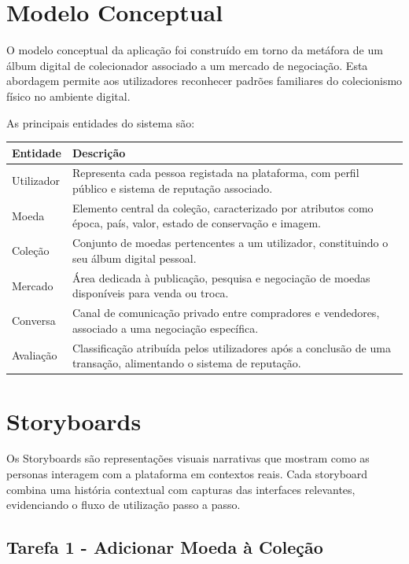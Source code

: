 \documentclass[12pt,a4paper]{article}
\begin{document}
\section{Modelo Conceptual}

O modelo conceptual da aplicação foi construído em torno da metáfora de um álbum digital de colecionador associado a um mercado de negociação. Esta abordagem permite aos utilizadores reconhecer padrões familiares do colecionismo físico no ambiente digital.

As principais entidades do sistema são:

\begin{longtable}{>{\raggedright\arraybackslash}p{} >{\raggedright\arraybackslash}p{}}
\toprule
\textbf{Entidade} & \textbf{Descrição} \\
\midrule
Utilizador & Representa cada pessoa registada na plataforma, com perfil público e sistema de reputação associado. \\
Moeda & Elemento central da coleção, caracterizado por atributos como época, país, valor, estado de conservação e imagem. \\
Coleção & Conjunto de moedas pertencentes a um utilizador, constituindo o seu álbum digital pessoal. \\
Mercado & Área dedicada à publicação, pesquisa e negociação de moedas disponíveis para venda ou troca. \\
Conversa & Canal de comunicação privado entre compradores e vendedores, associado a uma negociação específica. \\
Avaliação & Classificação atribuída pelos utilizadores após a conclusão de uma transação, alimentando o sistema de reputação. \\
\bottomrule
\end{longtable}

\section{Storyboards}

Os Storyboards são representações visuais narrativas que mostram como as personas interagem com a plataforma em contextos reais. Cada storyboard combina uma história contextual com capturas das interfaces relevantes, evidenciando o fluxo de utilização passo a passo.

\subsection{Tarefa 1 - Adicionar Moeda à Coleção}
\end{document}
